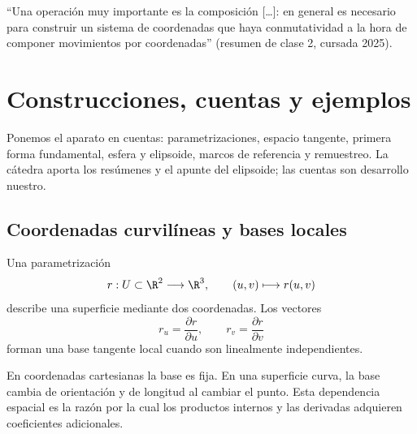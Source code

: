 \begin{idea}
``Una operación muy importante es la composición [\ldots]: en general es necesario para
construir un sistema de coordenadas que haya conmutatividad a la hora de componer
movimientos por coordenadas'' (resumen de clase 2, cursada 2025).
\end{idea}

\section{Construcciones, cuentas y ejemplos}

Ponemos el aparato en cuentas: parametrizaciones, espacio tangente, primera forma fundamental, esfera y elipsoide, marcos de referencia y remuestreo. La cátedra aporta los resúmenes y el apunte del elipsoide; las cuentas son desarrollo nuestro.

\subsection{Coordenadas curvilíneas y bases locales}\label{sec:curvilineas}

Una parametrización
\[
  r:U\subset\R^2\longrightarrow\R^3,
  \qquad
  (u,v)\longmapsto r(u,v)
\]
describe una superficie mediante dos coordenadas. Los vectores
\[
  r_u=\frac{\partial r}{\partial u},
  \qquad
  r_v=\frac{\partial r}{\partial v}
\]
forman una base tangente local cuando son linealmente independientes.

\begin{center}
\end{center}

En coordenadas cartesianas la base es fija. En una superficie curva, la base cambia de
orientación y de longitud al cambiar el punto. Esta dependencia espacial es la razón por la
cual los productos internos y las derivadas adquieren coeficientes adicionales.

